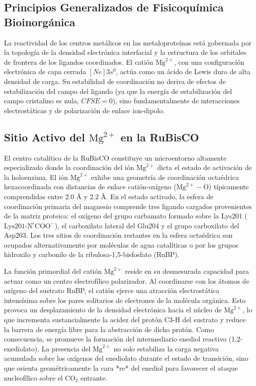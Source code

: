 \documentclass[12pt]{article}
\begin{document}
\subsection{Principios Generalizados de Fisicoquímica Bioinorgánica}

La reactividad de los centros metálicos en las metaloproteínas está gobernada por la topología de la densidad electrónica interfacial y la estructura de los orbitales de frontera de los ligandos coordinados. El catión $\text{Mg}^{2+}$, con una configuración electrónica de capa cerrada $[Ne] 3s^0$, actúa como un ácido de Lewis duro de alta densidad de carga. Su estabilidad de coordinación no deriva de efectos de estabilización del campo del ligando (ya que la energía de estabilización del campo cristalino es nula, $CFSE = 0$), sino fundamentalmente de interacciones electrostáticas y de polarización de enlace ion-dipolo.

\subsection{Sitio Activo del $\text{Mg}^{2+}$ en la RuBisCO}

El centro catalítico de la RuBisCO constituye un microentorno altamente especializado donde la coordinación del ión $\text{Mg}^{2+}$ dicta el estado de activación de la holoenzima. El ión $\text{Mg}^{2+}$ exhibe una geometría de coordinación octaédrica hexacoordinada con distancias de enlace catión-oxígeno ($\text{Mg}^{2+}-\text{O}$) típicamente comprendidas entre $2.0\text{ \AA}$ y $2.2\text{ \AA}$. En el estado activado, la esfera de coordinación primaria del magnesio comprende tres ligando cargados provenientes de la matriz proteica: el oxígeno del grupo carbamato formado sobre la Lys201 ($\text{Lys201-N}^\epsilon\text{COO}^-$), el carboxilato lateral del Glu204 y el grupo carboxilato del Asp203. Los tres sitios de coordinación restantes en la esfera octaédrica son ocupados alternativamente por moléculas de agua catalíticas o por los grupos hidroxilo y carbonilo de la ribulosa-1,5-bisfosfato (RuBP).

La función primordial del catión $\text{Mg}^{2+}$ reside en su desmesurada capacidad para actuar como un centro electrofílico polarizador. Al coordinarse con los átomos de oxígeno del sustrato RuBP, el catión ejerce una atracción electrostática intensísima sobre los pares solitarios de electrones de la molécula orgánica. Esto provoca un desplazamiento de la densidad electrónica hacia el núcleo de $\text{Mg}^{2+}$, lo que incrementa sustancialmente la acidez del protón C3-$\text{H}$ del sustrato y reduce la barrera de energía libre para la abstracción de dicho protón. Como consecuencia, se promueve la formación del intermediario enediol reactivo (1,2-enediolato). La presencia del $\text{Mg}^{2+}$ no solo estabiliza la carga negativa acumulada sobre los oxígenos del enediolato durante el estado de transición, sino que orienta geométricamente la cara *re* del enediol para favorecer el ataque nucleofílico sobre el $\text{CO}_2$ entrante.
\end{document}
